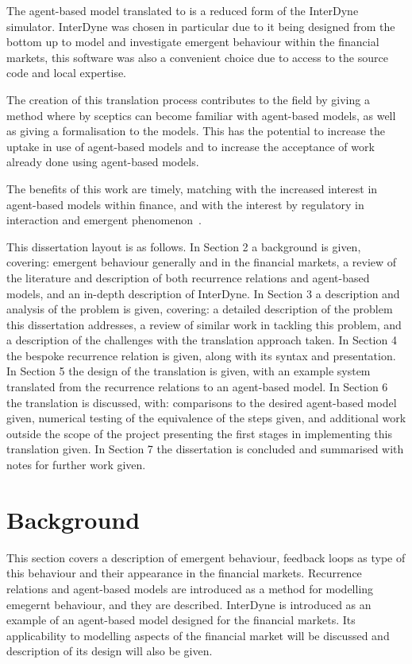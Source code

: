 \documentclass{article}
\begin{document}
The agent-based model translated to is a reduced form of the InterDyne simulator. InterDyne was chosen in particular due to it being designed from the bottom up to model and investigate emergent behaviour within the financial markets, this software was also a convenient choice due to access to the source code and local expertise.   

The creation of this translation process contributes to the field by giving a method where by sceptics can become familiar with agent-based models, as well as giving a formalisation to the models. This has the potential to increase the uptake in use of agent-based models and to increase the acceptance of work already done using agent-based models. 

The benefits of this work are timely, matching with the increased interest in agent-based models within finance, and with the interest by regulatory in interaction and emergent phenomenon~\cite{fallacyofcompostionBook, newwork1, newabmpaper}.  

This dissertation layout is as follows. In Section 2 a background is given, covering: emergent behaviour generally and in the financial markets, a review of the literature and description of both recurrence relations and agent-based models, and an in-depth description of InterDyne. In Section 3 a description and analysis of the problem is given, covering: a detailed description of the problem this dissertation addresses, a review of similar work in tackling this problem, and a description of the challenges with the translation approach taken. In Section 4 the bespoke recurrence relation is given, along with its syntax and presentation. In Section 5 the design of the translation is given, with an example system translated from the recurrence relations to an agent-based model. In Section 6 the translation is discussed, with: comparisons to the desired agent-based model given, numerical testing of the equivalence of the steps given, and additional work outside the scope of the project presenting the first stages in implementing this translation given. In Section 7 the dissertation is concluded and summarised with notes for further work given.     








\section{Background}
This section covers a description of emergent behaviour, feedback loops as type of this behaviour and their appearance in the financial markets. Recurrence relations and agent-based models are introduced as a method for modelling emegernt behaviour, and they are described. InterDyne is introduced as an example of an agent-based model designed for the financial markets. Its applicability to modelling aspects of the financial market will be discussed and description of its design will also be given.   
\end{document}
